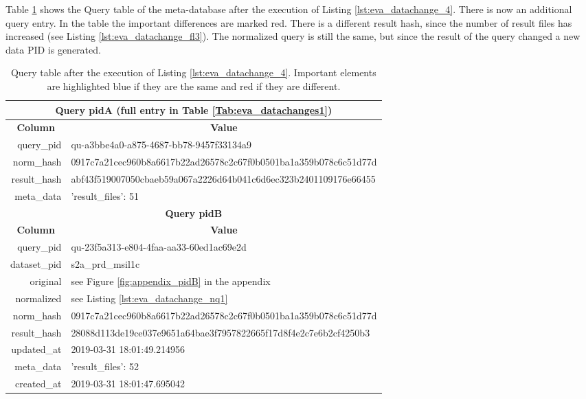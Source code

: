 \documentclass[draft,final]{vutinfth} %
\begin{document}
\begin{enumerate}
	Table \ref{Tab:eva_datachanges3} shows the Query table of the meta-database after the execution of Listing \ref{lst:eva_datachange_4}. There is now an additional query entry. In the table the important differences are marked red. There is a different result hash, since the number of result files has increased (see Listing \ref{lst:eva_datachange_fl3}). The normalized query is still the same, but since the result of the query changed a new data PID is generated. 
	
	\begin{table}[]
		\caption{Query table after the execution of Listing \ref{lst:eva_datachange_4}. Important elements are highlighted blue if they are the same and red if they are different.}
		\centering
		\begin{tabular}{|r|l|}
			\hline \multicolumn{2}{|c|}{\textbf{Query pidA (full entry in Table \ref{Tab:eva_datachanges1})}} \\
			\hline \multicolumn{1}{|c|}{\textbf{Column}}  &  \multicolumn{1}{c|}{\textbf{Value}} \\ \hline
			query\_pid & {\color{red}qu-a3bbe4a0-a875-4687-bb78-9457f33134a9}  \\ 
			norm\_hash & {\color{blue}0917c7a21cec960b8a6617b22ad26578c2c67f0b0501ba1a359b078c6c51d77d}  \\
			result\_hash & {\color{red}abf43f519007050cbaeb59a067a2226d64b041c6d6ec323b2401109176e66455}   \\
			meta\_data & {'result\_files': 51}  \\
			\hline \multicolumn{2}{|c|}{\textbf{Query pidB}} \\
			\hline \multicolumn{1}{|c|}{\textbf{Column}}  &  \multicolumn{1}{c|}{\textbf{Value}} \\ \hline
			query\_pid & { \color{red} qu-23f5a313-e804-4faa-aa33-60ed1ac69e2d}  \\ 
			dataset\_pid & s2a\_prd\_msil1c  \\ 
			original & see Figure \ref{fig:appendix_pidB} in the appendix \\
			normalized & see Listing \ref{lst:eva_datachange_nq1}  \\
			norm\_hash & {\color{blue}0917c7a21cec960b8a6617b22ad26578c2c67f0b0501ba1a359b078c6c51d77d}  \\
			result\_hash & {\color{red}28088d113de19ce037e9651a64bae3f7957822665f17d8f4e2c7e6b2cf4250b3 }  \\
			updated\_at & 2019-03-31 18:01:49.214956   \\
			meta\_data & {\color{red}'result\_files': 52}  \\
			created\_at & 2019-03-31 18:01:47.695042   \\ \hline
		\end{tabular}
		\label{Tab:eva_datachanges3}
	\end{table}
	

\end{enumerate}
\end{document}
